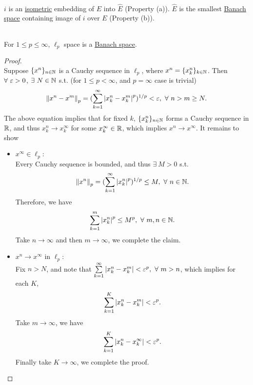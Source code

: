 \begin{remark}\ \\
    $i$ is an \underline{isometric} embedding of $E$ into $\hat{E}$ (Property (a)). $\hat{E}$ is the smallest \underline{Banach space} containing image of $i$ over $E$ (Property (b)). 
\end{remark}


\vspace{3pt}
\begin{theorem}\ \\
For $1 \leq p \leq \infty$, $\ell_p$ space is a \underline{Banach space}.
\end{theorem}
\begin{proof}\ \\
Suppose $\{x^n\}_{n \in \mathbb{N}}$ is a Cauchy sequence in $\ell_p$, where $x^n = \{x^n_k\}_{k \in \mathbb{N}}$. Then $\forall\ \varepsilon > 0$, $\exists\ N \in \mathbb{N}$ s.t. (for $1 \leq p < \infty$, and $p = \infty$ case is trivial)
\begin{equation*}
    \norm{x^n - x^m}_p = (\summ{k=1}{\infty} \abs{x^n_k - x^m_k}^{p})^{1/p} < \vep,\ \forall\ n > m \geq N.
\end{equation*}
The above equation implies that for fixed $k$, $\{x_k^n\}_{n \in \mathbb{N}}$ forms a Cauchy sequence in $\mathbb{R}$, and thus $x_k^n \to x_k^\infty$ for some $x^\infty_k \in \mathbb{R}$, which implies $x^n \to x^\infty$. It remains to show
\begin{itemize}
    \item $x^\infty \in \ell_p:$\\
    Every Cauchy sequence is bounded, and thus $\exists\ M > 0$ s.t.
    \begin{equation*}
        \norm{x^n}_p = (\sum\limits_{k=1}^{\infty} \abs{x^n_k}^p)^{1/p} \leq M,\ \forall\ n \in \mathbb{N}.
    \end{equation*}
    Therefore, we have
    \begin{equation*}
        \summ{k=1}{m} \abs{x^n_k}^p \leq M^p,\ \forall\ m,n \in \N.
    \end{equation*}
    Take $n \to \infty$ and then $m \to \infty$, we complete the claim.
    \item $x^n \to x^\infty$ in $\ell_p$:\\
    Fix $n > N$, and note that $\sum\limits_{k=1}^{\infty} \abs{x^n_k - x^m_k} < \varepsilon^p,\ \forall\ m > n$, which implies for each $K$,
    \begin{equation*}
        \sum\limits_{k=1}^{K} \abs{x^n_k - x^m_k} < \varepsilon^p.
    \end{equation*}
Take $m \to \infty$, we have
    \begin{equation*}
        \sum\limits_{k=1}^{K} \abs{x^n_k - x^\infty_k} < \varepsilon^p.
    \end{equation*}
    Finally take $K \to \infty$, we complete the proof.
\end{itemize}
\end{proof}
